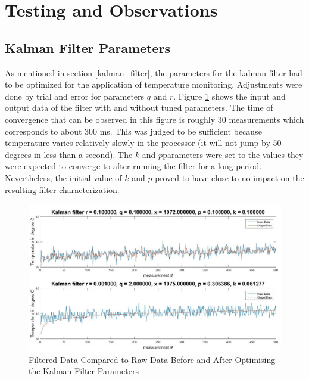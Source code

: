 \documentclass[12pt]{article}
\begin{document}
\section{Testing and Observations}

\subsection{Kalman Filter Parameters}\label{kalman_filter_params}
As mentioned in section \ref{kalman_filter}, the parameters for the kalman filter had to be optimized for the application of temperature monitoring. Adjustments were done by trial and error for parameters $q$ and $r$. Figure \ref{fig:kalmanfilter} shows the input and output data of the filter with and without tuned parameters. The time of convergence that can be observed in this figure is roughly 30 measurements which corresponds to about 300 ms. This was judged to be sufficient because temperature varies relatively slowly in the processor (it will not jump by 50 degrees in less than a second). The $k$ and $p $parameters were set to the values they were expected to converge to after running the filter for a long period. Nevertheless, the initial value of $k$ and $p$ proved to have close to no impact on the resulting filter characterization.
\begin{figure}[!htb]
\centering
\includegraphics[scale=0.50]{images/kalmanfilter.jpg}
\caption{Filtered Data Compared to Raw Data Before and After Optimising the Kalman Filter Parameters}
\label{fig:kalmanfilter}
\end{figure}
\end{document}
